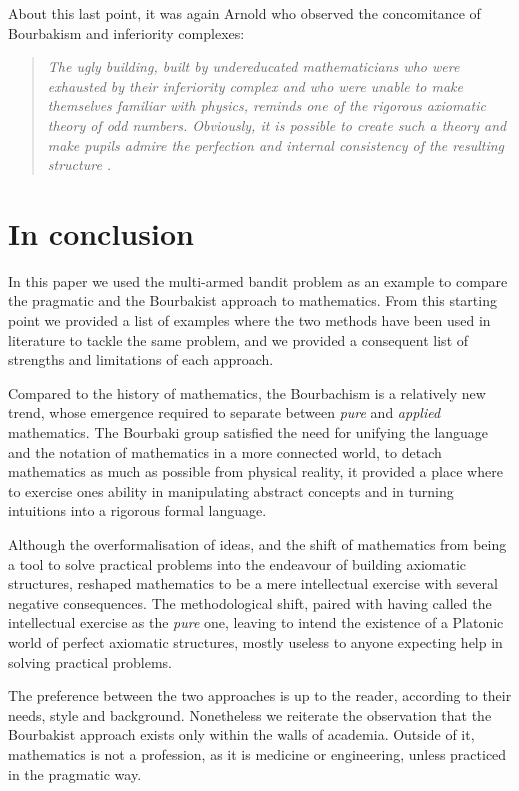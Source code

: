 \documentclass[]{scrartcl}
\theoremstyle{definition}
\begin{document}
About this last point, it was again Arnold who observed the concomitance of Bourbakism and inferiority complexes:

\begin{quotation}
    \emph{The ugly building, built by undereducated mathematicians who were exhausted by their inferiority complex and who were unable to make themselves familiar with physics, reminds one of the rigorous axiomatic theory of odd numbers. Obviously, it is possible to create such a theory and make pupils admire the perfection and internal consistency of the resulting structure 
    .}~\cite{arnol1998teaching}
\end{quotation}




\section{In conclusion}

In this paper we used the multi-armed bandit problem as an example to compare the pragmatic and the Bourbakist approach to mathematics. From this starting point we provided a list of examples where the two methods have been used in literature to tackle the same problem, and we provided a consequent list of strengths and limitations of each approach. 

Compared to the history of mathematics, the Bourbachism is a relatively new trend, whose emergence required to separate between \emph{pure} and \emph{applied} mathematics. The Bourbaki group satisfied the need for unifying the language and the notation of mathematics in a more connected world, to detach mathematics as much as possible from physical reality, it provided a place where to exercise ones ability in manipulating abstract concepts and in turning intuitions into a rigorous formal language.

Although the overformalisation of ideas, and the shift of mathematics from being a tool to solve practical problems into the endeavour of building axiomatic structures, reshaped mathematics to be a mere intellectual exercise with several negative consequences. The methodological shift, paired with having called the intellectual exercise as the \emph{pure} one, leaving to intend the existence of a Platonic world of perfect axiomatic structures, mostly useless to anyone expecting help in solving practical problems. 

The preference between the two approaches is up to the reader, according to their needs, style and background. Nonetheless we reiterate the observation that the Bourbakist approach exists only within the walls of academia. Outside of it, mathematics is not a profession, as it is medicine or engineering, unless practiced in the pragmatic way.
\end{document}
